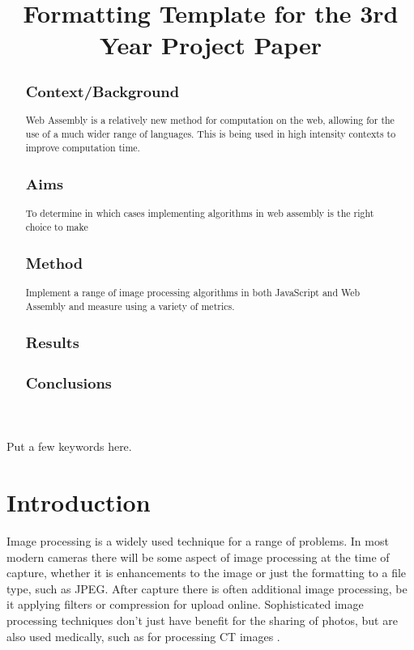 \documentclass[12pt,a4paper]{article}
\title{Formatting Template for the 3rd Year Project Paper}
\author{} %
\date{}
\begin{document}
\maketitle

\begin{abstract}
    \subsection{Context/Background}
    Web Assembly is a relatively new method for computation on the web, allowing for the use of a much wider range of languages. This is being used in high intensity contexts to improve computation time.

    \subsection{Aims}

    To determine in which cases implementing algorithms in web assembly is the right choice to make

    \subsection{Method}

    Implement a range of image processing algorithms in both JavaScript and Web Assembly and measure using a variety of metrics.

    \subsection{Results}

    \subsection{Conclusions}
\end{abstract}

\begin{keywords}
    Put a few keywords here.
\end{keywords}

\newpage

\section{Introduction}

Image processing is a widely used technique for a range of problems. In most modern cameras there will be some aspect of image processing at the time of capture, whether it is enhancements to the image or just the formatting to a file type, such as JPEG. After capture there is often additional image processing, be it applying filters or compression for upload online. Sophisticated image processing techniques don't just have benefit for the sharing of photos, but are also used medically, such as for processing CT images \cite{zhang2017applications}.
\end{document}
